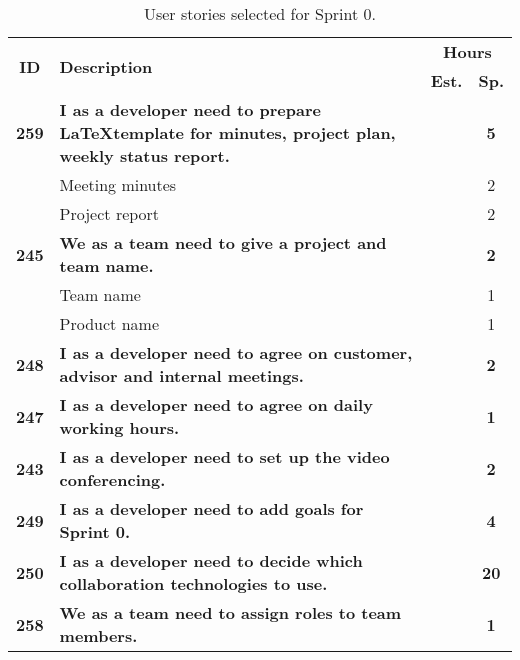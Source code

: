 \begin{table*}[!h]
\caption{User stories selected for Sprint 0. }
\label{tab:sprint0stories}
\def\arraystretch{1.25}
\begin{tabularx}{\textwidth}{cXcc} 

\toprule[1mm]
\multirow{2}{*}{\textbf{ID}} & \multirow{2}{*}{\textbf{Description}} & \multicolumn{2}{c}{\textbf{Hours}} \\
 					& & \textbf{Est.} & \textbf{Sp.} \\
\midrule
\textbf{259} 	& {\bf I as a developer need to prepare \LaTeX template for minutes, project plan, weekly status report.} 	& 			& \textbf{5} \\
				& \hspace{2em} Meeting minutes	&  & 2 \\
				& \hspace{2em} Project report 	&  & 2 \\

\textbf{245} 	& \textbf{We as a team need to give a project and team name.} 						& 			& \textbf{2} \\
				& \hspace{2em} Team name &  & 1 \\
				& \hspace{2em} Product name &  & 1 \\

\textbf{248} 	& \textbf{I as a developer need to agree on customer, advisor and internal meetings.} 						& 			& \textbf{2} \\

\textbf{247} 	& \textbf{I as a developer need to agree on daily working hours.} 						&  			& \textbf{1} \\

\textbf{243} 	& \textbf{I as a developer need to set up the video conferencing.} 						& 			& \textbf{2} \\

\textbf{249} 	& \textbf{I as a developer need to add goals for Sprint 0.} 						& 			& \textbf{4} \\

\textbf{250} 	& \textbf{I as a developer need to decide which collaboration technologies to use.} 						& 			& \textbf{20} \\

\textbf{258} 	& \textbf{We as a team need to assign roles to team members.} 						& 			& \textbf{1} \\


\end{tabularx}
\end{table*}
